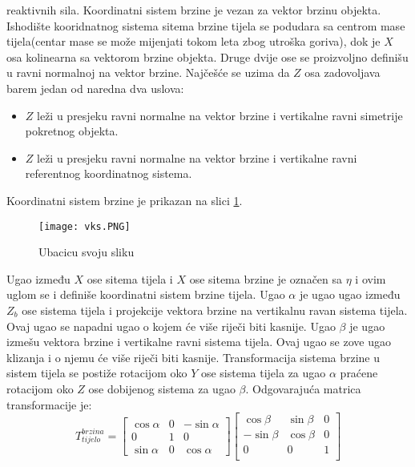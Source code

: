 reaktivnih sila. Koordinatni sistem brzine je vezan za vektor brzinu objekta. Ishodište kooridnatnog sistema 
sitema brzine tijela se podudara sa centrom mase tijela(centar mase se može mijenjati tokom leta zbog utroška goriva), dok 
je $X$ osa kolinearna sa vektorom brzine objekta. Druge dvije ose se proizvoljno definišu u ravni 
normalnoj na vektor brzine. Najčešće se uzima da $Z$ osa zadovoljava barem jedan od naredna dva uslova:
\begin{itemize}
    \item $Z$ leži u presjeku ravni normalne na vektor brzine i vertikalne ravni simetrije pokretnog objekta.
    \item $Z$ leži u presjeku ravni normalne na vektor brzine i vertikalne ravni referentnog koordinatnog sistema.
\end{itemize}
Koordinatni sistem brzine je prikazan na slici \ref{fig:vks}.
\begin{figure}[!ht]
    \centering
    \texttt{[image: vks.PNG]}
    \caption{Ubacicu svoju sliku}
    \label{fig:vks}
\end{figure}
Ugao između $X$ ose sitema tijela i $X$ ose sitema brzine je označen sa $\eta$ i ovim uglom se i definiše 
koordinatni sistem brzine tijela. Ugao $\alpha$ je ugao ugao između $Z_b$ ose  sistema tijela i projekcije 
vektora brzine na vertikalnu ravan sistema tijela. Ovaj ugao se napadni ugao o kojem će više riječi biti kasnije. 
Ugao $\beta$ je ugao izmešu vektora brzine i vertikalne ravni sistema tijela. Ovaj ugao se zove ugao klizanja i o njemu će 
više riječi biti kasnije. Transformacija sistema brzine u sistem tijela se postiže rotacijom 
oko $Y$ ose sistema tijela za ugao $\alpha$ praćene rotacijom oko $Z$ ose dobijenog sistema za ugao $\beta$. 
Odgovarajuća matrica transformacije je:
\begin{equation}
    T_{tijelo}^{brzina} = \begin{bmatrix}
        \cos\alpha & 0 & -\sin\alpha \\
        0& 1& 0\\
        \sin\alpha & 0 & \cos\alpha
    \end{bmatrix}
    \begin{bmatrix}
        \cos\beta & \sin\beta & 0\\
        -\sin\beta & \cos\beta & 0\\
        0 & 0& 1\\
    \end{bmatrix}
    \label{eq:VtoB}
\end{equation}

